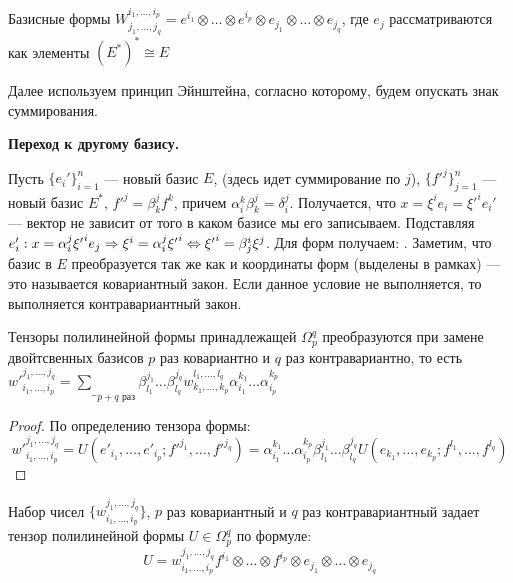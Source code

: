 \begin{prop}
	Базисные формы $W_{j_1, \ldots, j_q}^{i_1, \ldots, i_p} = e^{i_1}\otimes\ldots\otimes e^{i_p}\otimes e_{j_1}\otimes\ldots\otimes e_{j_q}$, где $e_j$ рассматриваются как элементы $(E^*)^*\cong E$
\end{prop}

Далее используем принцип Эйнштейна, согласно которому, будем опускать знак суммирования.

\textbf{Переход к другому базису.}

Пусть $\{e_i'\}_{i=1}^n$ --- новый базис $E$,  (здесь идет суммирование по $j$), $\{{f'}^j\}_{j=1}^n$ --- новый базис $E^*$, ${f'}^j= \beta_k^j f^k$, причем $\alpha_i^k \beta_k^j=\delta_i^j$. Получается, что $x=\xi^i e_i ={\xi'}^i e_i'$ --- вектор не зависит от того в каком базисе мы его записываем. Подставляя $e_i': x = \alpha_i^j{\xi'}^ie_j \Rightarrow \\ \xi^i = \alpha_i^j{\xi'}^i \Leftrightarrow {\xi'}^i=\beta_j^i\xi^j$. Для форм получаем: . Заметим, что базис в $E$ преобразуется так же как и координаты форм (выделены в рамках) --- это называется ковариантный закон. Если данное условие не выполняется, то выполняется контравариантный закон.
\begin{prop}
	Тензоры полилинейной формы принадлежащей $\Omega_p^q$ преобразуются при замене двойтсвенных базисов $p$ раз ковариантно и $q$ раз контравариантно, то есть ${w'}_{i_1, \ldots, i_p}^{j_1, \ldots, j_q}=\underbrace{\sum}_{p+q\text{ раз}}\beta^{j_1}_{l_1}\ldots\beta_{l_q}^{j_q}w_{k_1, \ldots, k_p}^{l_1, \ldots, l_q}\alpha_{i_1}^{k_1}\ldots\alpha_{i_p}^{k_p}$
\end{prop}

\begin{proof} По определению тензора формы:
	$${w'}_{i_1, \ldots, i_p}^{j_1, \ldots, j_q}=U({e'}_{i_1}, \ldots, {e'}_{i_p}; {f'}^{j_1}, \ldots, {f'}^{j_q}) = \alpha_{i_1}^{k_1}\ldots \alpha_{i_p}^{k_p}\beta_{l_1}^{j_1}\ldots\beta_{l_q}^{j_q}U(e_{k_1}, \ldots, e_{k_p};f^{l_1}, \ldots, f^{l_q})$$
\end{proof}

\begin{prop}
	Набор чисел $\{{w}_{i_1, \ldots, i_p}^{j_1, \ldots, j_q}\}$, $p$ раз ковариантный и $q$ раз контравариантный задает тензор полилинейной формы $U\in \Omega_p^q$ по формуле: $$U={w}_{i_1, \ldots, i_p}^{j_1, \ldots, j_q}f^{i_1}\otimes\ldots\otimes f^{i_p}\otimes e_{j_1}\otimes\ldots\otimes e_{j_q}$$
\end{prop}


